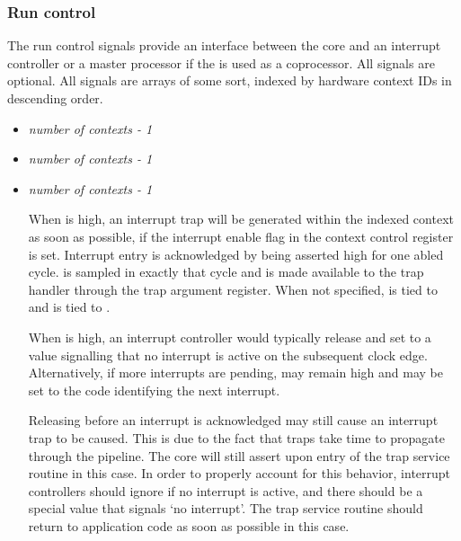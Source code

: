 
\subsubsection{Run control}
\label{sec:core-ug-cfg-inst-iface-rctrl}

The run control signals provide an interface between the core and an interrupt 
controller or a master processor if the \rvex{} is used as a coprocessor. All 
signals are optional. All signals are arrays of some sort, indexed by hardware 
context IDs in descending order.

\begin{itemize}

\item {}\textit{number of contexts - 1}
\item {}\textit{number of contexts - 1}
\item {}\textit{number of contexts - 1}

When  is high, an interrupt trap will be generated within the 
indexed context as soon as possible, if the interrupt enable flag in the context 
control register is set. Interrupt entry is acknowledged by 
 being asserted high for one abled cycle. 
 is sampled in exactly that cycle and is made available to 
the trap handler through the trap argument register. When not specified, 
 is tied to  and  is tied to 
.

When  is high, an interrupt controller would typically 
release  and set  to a value signalling 
that no interrupt is active on the subsequent clock edge. Alternatively, if more
interrupts are pending,   may remain high and
 may be set to the  code identifying the next interrupt.

Releasing  before an interrupt is acknowledged may still 
cause an interrupt trap to be caused. This is due to the fact that traps take 
time to propagate through the pipeline. The core will still assert 
 upon entry of the trap service routine in this case. In 
order to properly account for this behavior, interrupt controllers should ignore 
 if no interrupt is active, and there should be a special 
 value that signals `no interrupt'. The trap service 
routine should return to application code as soon as possible in this case.


\end{itemize}
